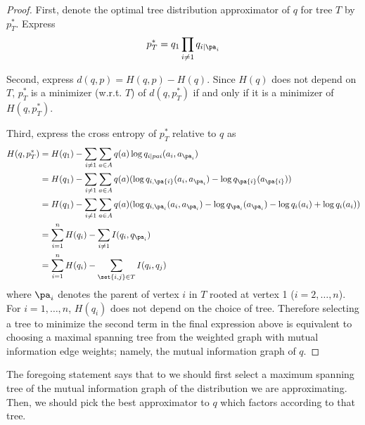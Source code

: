 \begin{proof}First, denote the optimal tree distribution approximator of $q$ for tree $T$ by $p^*_T$.
Express
\[
p^*_T = q_1 \prod_{i \neq 1} q_{i \mid \pa_i}
\]

Second, express $d(q, p) = H(q, p) - H(q)$.
Since $H(q)$ does not depend on $T$, $p^*_T$ is a minimizer (w.r.t. $T$) of $d(q, p^*_T)$ if and only if it is a minimizer of $H(q, p^*_T)$.

Third, express the cross entropy of $p^*_T$ relative to $q$ as
\[
\begin{aligned}
H(q, p^*_T) &= H(q_1) - \sum_{i \neq 1} \sum_{a \in A} q(a)\log q_{i \mid pa{i}}(a_i, a_{\pa_i}) \\
&= H(q_1) - \sum_{i \neq 1} \sum_{a \in A} q(a)(\log q_{i,\pa{i}}(a_i, a_{\pa_i}) - \log q_{\pa{i}}(a_{\pa{i}})) \\
&= H(q_1) - \sum_{i \neq 1} \sum_{a \in A} q(a)(\log q_{i,\pa_i}(a_i, a_{\pa_i}) - \log q_{\pa_i}(a_{\pa_i}) - \log q_i(a_i) + \log q_{i}(a_i)) \\
&= \sum_{i = 1}^{n} H(q_i) - \sum_{i \neq 1} I(q_i, q_{\pa_i}) \\
&= \sum_{i = 1}^{n} H(q_i) - \sum_{\set{i,j} \in T} I(q_i, q_{j}) \\
\end{aligned}
\]
where $\pa_i$ denotes the parent of vertex $i$ in $T$ rooted at vertex 1 ($i = 2, \dots , n$).
For $i = 1, \dots , n$, $H(q_i)$ does not depend on the choice of tree.
Therefore selecting a tree to minimize the second term in the final expression above is equivalent to choosing a maximal spanning tree from the weighted graph with mutual information edge weights; namely, the mutual information graph of $q$.
\end{proof}
The foregoing statement says that to we should first select a maximum spanning tree of the mutual information graph of the distribution we are approximating.
Then, we should pick the best approximator to $q$ which factors according to that tree.
